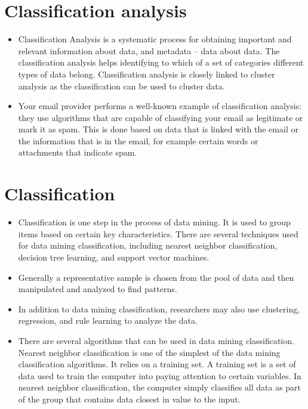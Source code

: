 \documentclass[]{report}
\begin{document}
\section{Classification analysis}
\begin{itemize}
\item Classification Analysis is a systematic process for obtaining important and relevant information about data, and metadata – data about data. The classification analysis helps identifying to which of a set of categories different types of data belong. Classification analysis is closely linked to cluster analysis as the classification can be used to cluster data.

\item Your email provider performs a well-known example of classification analysis: they use algorithms that are capable of classifying your email as legitimate or mark it as spam. This is done based on data that is linked with the email or the information that is in the email, for example certain words or attachments that indicate spam.
\end{itemize}
\section*{Classification}
\begin{itemize}
\item Classification is one step in the process of data mining. It is used to group items based on certain key characteristics. There are several techniques used for data mining classification, including nearest neighbor classification, decision tree learning, and support vector machines.

\item Generally a representative sample is chosen from the pool of data and then manipulated and analyzed to find patterns. 

\item In addition to data mining classification, researchers may also use clustering, regression, and rule learning to analyze the data.

\item There are several algorithms that can be used in data mining classification. Nearest neighbor classification is one of the simplest of the data mining classification algorithms. It relies on a training set. A training set is a set of data used to train the computer into paying attention to certain variables. In nearest neighbor classification, the computer simply classifies all data as part of the group that contains data closest in value to the input.
\end{itemize}
\end{document}
